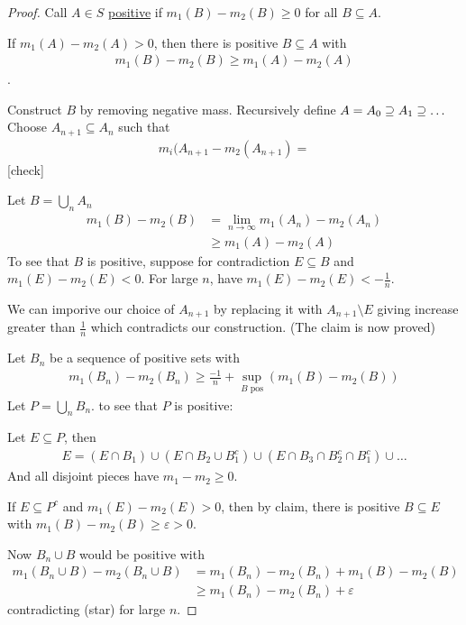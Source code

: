 \begin{proof}
	Call $A \in S$ \underline{positive} if $m_1 (B) - m_2 (B) \geq 0$ for all $B \subseteq A$.

	 \begin{claim}
		 If $m_1 (A) - m_{2} (A) > 0$, then there is positive $B \subseteq A$ with
		 \begin{align*}
			 m_{1} (B) - m_{2} (B) \geq m_1 (A) - m_2 (A)
		 \end{align*}.
	\end{claim}
	Construct $B$ by removing negative mass. Recursively define $A = A_{0} \supseteq A_1 \supseteq \ldots$
	Choose $A_{n+1 } \subseteq A_{n}$ such that
	\begin{align*}
		m_{i} (A_{n +1} - m_{2} (A_{n+1}) =
	\end{align*} [check]

	Let $B = \bigcup_{n} A_{n}$
	\begin{align*}
		m_{1} (B) - m_{2} (B) &= \lim_{n \to \infty} m_{1} (A_{n}) - m_{2} (A_{n}) \\
							  &\geq m_{1} (A) - m_{2} (A)
	\end{align*}
	To see that $B$ is positive, suppose for contradiction $E \subseteq B$ and $m_{1} (E) - m_{2} (E) < 0$.
	For large $n$, have $m_1 (E) - m_{2} (E) < -\frac{1}{n}$.

	We can imporive our choice of $A_{n +1}$ by replacing it with $A_{n +1 } \setminus E$ giving increase greater than $\frac{1}{n}$ which contradicts our construction.
	(The claim is now proved)

	Let $B_{n}$ be a sequence of positive sets with
	\begin{align*}
		m_{1} (B_{n}) - m_{2} (B_{n}) \geq \frac{-1}{n} + \sup_{B \text{ pos}} (m_{1} (B) - m_{2} (B))
	\end{align*}
	Let $P = \bigcup_{n} B_{n}$. to see that $P$ is positive:

	Let $E \subseteq  P$, then
	\begin{align*}
		E = ( E \cap B_{1} ) \cup ( E \cap B_{2} \cup B_{1}^c) \cup ( E \cap B_{3} \cap B_{2}^{c} \cap B_{1}^c ) \cup \ldots
	\end{align*}
	And all disjoint pieces have $m_{1} - m_{2} \geq 0$.

	If $E \subseteq P^c$ and $m_{1} (E) - m_{2} (E) > 0$, then by claim, there is positive $B \subseteq E$
	with $m_{1} (B) - m_{2} (B) \geq \varepsilon > 0$.

	Now $B_{n} \cup B$ would be positive with
	\begin{align*}
		m_{1} (B_{n} \cup B) - m_{2} (B_{n} \cup B) &= m_{1} (B_{n}) - m_{2} (B_{n} ) + m_{1} (B) - m_{2} (B) \\
													&\geq m_{1} (B_{n}) - m_{2} (B_{n} ) + \varepsilon
	\end{align*}
	contradicting (star) for large $n$.
\end{proof}

